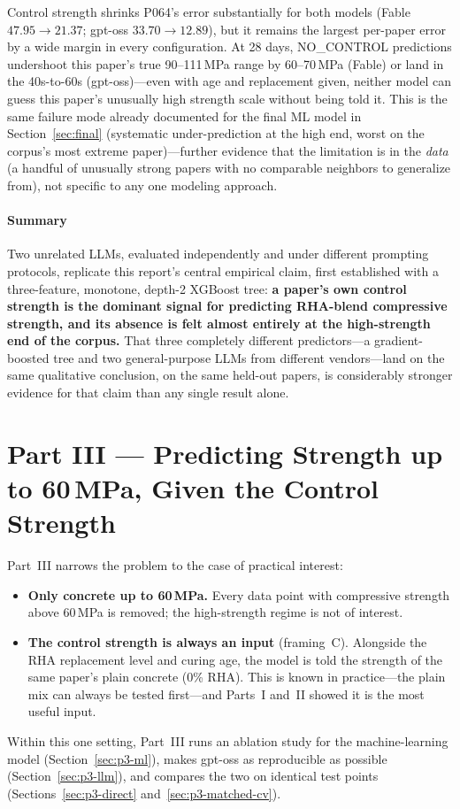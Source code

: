 \documentclass[11pt]{article}
\begin{document}
\noindent Control strength shrinks P064's error substantially for both models (Fable
$47.95\to21.37$; gpt-oss $33.70\to12.89$), but it remains the largest per-paper error by
a wide margin in every configuration. At 28 days, NO\_CONTROL predictions undershoot
this paper's true 90--111\,MPa range by 60--70\,MPa (Fable) or land in the 40s-to-60s
(gpt-oss)---even with age and replacement given, neither model can guess this paper's
unusually high strength scale without being told it. This is the same failure mode
already documented for the final ML model in Section~\ref{sec:final} (systematic
under-prediction at the high end, worst on the corpus's most extreme paper)---further
evidence that the limitation is in the \emph{data} (a handful of unusually strong papers
with no comparable neighbors to generalize from), not specific to any one modeling
approach.

\subsection{Summary}
Two unrelated LLMs, evaluated independently and under different prompting protocols,
replicate this report's central empirical claim, first established with a
three-feature, monotone, depth-2 XGBoost tree: \textbf{a paper's own control strength
is the dominant signal for predicting RHA-blend compressive strength, and its absence
is felt almost entirely at the high-strength end of the corpus.} That three completely
different predictors---a gradient-boosted tree and two general-purpose LLMs from
different vendors---land on the same qualitative conclusion, on the same held-out
papers, is considerably stronger evidence for that claim than any single result alone.

\part*{Part III --- Predicting Strength up to 60\,MPa, Given the Control Strength}
\label{sec:part3}

Part~III narrows the problem to the case of practical interest:
\begin{itemize}\itemsep2pt
  \item \textbf{Only concrete up to 60\,MPa.} Every data point with compressive strength
        above 60\,MPa is removed; the high-strength regime is not of interest.
  \item \textbf{The control strength is always an input} (framing~C). Alongside the RHA
        replacement level and curing age, the model is told the strength of the same
        paper's plain concrete (0\% RHA). This is known in practice---the plain mix can
        always be tested first---and Parts~I and~II showed it is the most useful input.
\end{itemize}
Within this one setting, Part~III runs an ablation study for the machine-learning model
(Section~\ref{sec:p3-ml}), makes gpt-oss as reproducible as possible
(Section~\ref{sec:p3-llm}), and compares the two on identical test points
(Sections~\ref{sec:p3-direct} and~\ref{sec:p3-matched-cv}).
\end{document}
